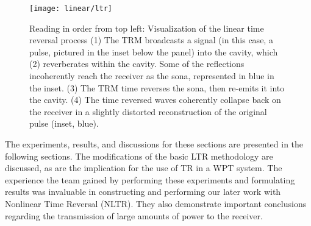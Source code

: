 \begin{figure}[]
\centering
\texttt{[image: linear/ltr]}
    \caption[Conceptual overview of linear time reversal]{Reading in order from top left: Visualization of the linear time reversal process (1) The TRM broadcasts a signal (in this case, a pulse, pictured in the inset below the panel) into the cavity, which (2) reverberates within the cavity. Some of the reflections incoherently reach the receiver as the sona, represented in blue in the inset. (3) The TRM time reverses the sona, then re-emits it into the cavity. (4) The time reversed waves coherently collapse back on the receiver in a slightly distorted reconstruction of the original pulse (inset, blue).}
    \label{fig:linear-ltr}
\end{figure}

The experiments, results, and discussions for these sections are presented in the following sections. The modifications of the basic LTR methodology are discussed, as are the implication for the use of TR in a WPT system. The experience the team gained by performing these experiments and formulating results was invaluable in constructing and performing our later work with Nonlinear Time Reversal (NLTR). They also demonstrate important conclusions regarding the transmission of large amounts of power to the receiver.
